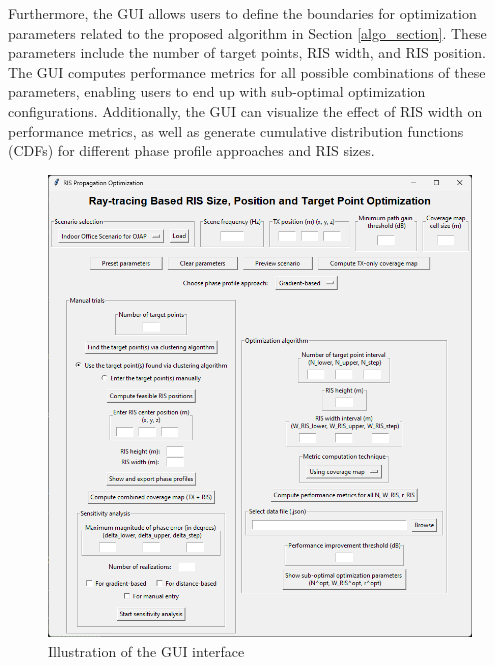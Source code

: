 \documentclass{IEEEoj}
\begin{document}
Furthermore, the GUI allows users to define the boundaries for optimization parameters related to the proposed algorithm in Section \ref{algo_section}. These parameters include the number of target points, RIS width, and RIS position. The GUI computes performance metrics for all possible combinations of these parameters, enabling users to end up with sub-optimal optimization configurations. Additionally, the GUI can visualize the effect of RIS width on performance metrics, as well as generate cumulative distribution functions (CDFs) for different phase profile approaches and RIS sizes.

\begin{figure}
	\centering \includegraphics[width=\linewidth]{Sim_Results/GUI.png}
	\caption{Illustration of the GUI interface}
	\label{GUI}
\end{figure}
\end{document}
